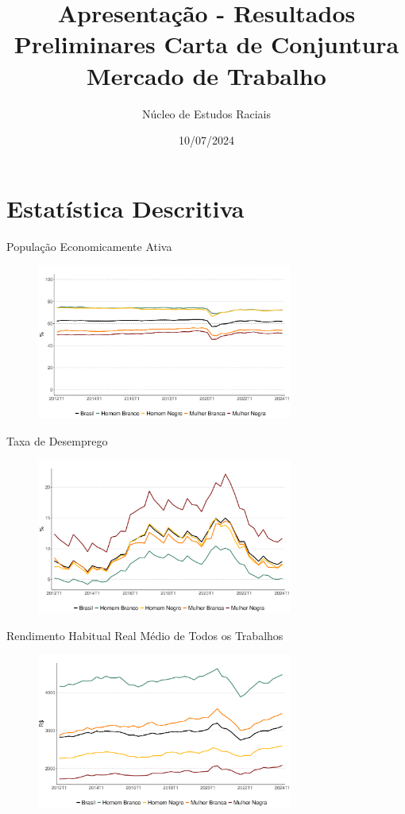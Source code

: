 \documentclass[10pt, xcolor=x11names,compress]{beamer}
\author{Núcleo de Estudos Raciais}
\title{Apresentação - Resultados Preliminares Carta de Conjuntura Mercado de Trabalho}
\institute{Insper}\date{10/07/2024}
\begin{document}
	\begin{frame}
		\titlepage
	\end{frame}
	
	
	\section{Estatística Descritiva} 
	\begin{frame}{População Economicamente Ativa}
		\begin{figure}
			\centering
			\includegraphics[width = 0.75\textwidth]{../figures_output/pea_br_gen_raca.pdf}
		\end{figure}
	\end{frame}			
	
	
	\begin{frame}{Taxa de Desemprego}
		\begin{figure}
			\centering
			\includegraphics[width = 0.75\textwidth]{../figures_output/unemp_br_gen_raca.pdf}
		\end{figure}
	\end{frame}			
	
	
	\begin{frame}{Rendimento Habitual Real Médio de Todos os Trabalhos}
		\begin{figure}
			\centering
			\includegraphics[width = 0.75\textwidth]{../figures_output/rendimento_habitual_br_gen_raca.pdf}
		\end{figure}
	\end{frame}
	
\end{document}
